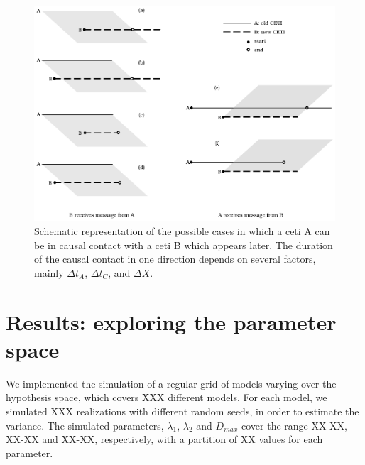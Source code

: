 \documentclass[crop]{CSLB}%
\begin{document}
\begin{figure}
   \centering
   \includegraphics[width=\textwidth]{Messages_01.pdf}
   \caption{Schematic representation of the possible cases in which a
   ceti A can be in causal contact with a ceti B which appears later.
   The duration of the causal contact in one direction depends on
   several factors, mainly $\Delta t_A$, $\Delta t_C$, and $\Delta X$.}
   \label{F_messages}
\end{figure}


 


\section{Results: exploring the parameter space}\label{S_results}


We implemented the simulation of a regular grid of models varying over the
hypothesis space, which covers XXX different models.
%
For each model, we simulated XXX realizations with different random
seeds, in order to estimate the variance.
%
The simulated parameters, $\lambda_1$, $\lambda_2$ and $D_{max}$ cover
the range XX-XX, XX-XX and XX-XX, respectively, with a partition of XX
values for each parameter.
\end{document}
